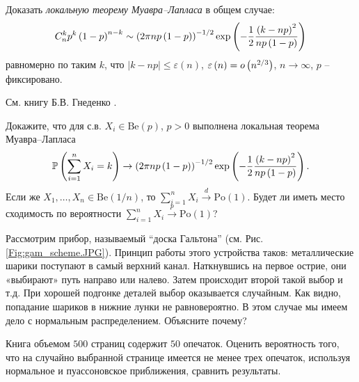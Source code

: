\begin{problem} Доказать \textit{локальную теорему Муавра--Лапласа} в общем случае:
\[
C_n^k p^k\left( {1-p} \right)^{n-k}\sim \left( {2\pi np\left( {1-p} \right)} 
\right)^{-1 \mathord{\left/ {\vphantom {1 2}} \right. 
\kern-\nulldelimiterspace} 2}\exp \left( {-\frac{1}{2}\frac{\left( {k-np} 
\right)^2}{np\left( {1-p} \right)}} \right)
\]
равномерно по таким $k$, что $\left| {k-np} \right|\le \varepsilon \left( n 
\right)$, $\varepsilon \left( n \right)=o\left( {n^{2 \mathord{\left/ 
{\vphantom {2 3}} \right. \kern-\nulldelimiterspace} 3}} \right)$, $n\to 
\infty $, $p$ -- фиксировано.
\end{problem}

\begin{ordre}
См. книгу Б.В. Гнеденко \cite{2}. 
\end{ordre}

\begin{problem}
Докажите, что для с.в. $X_i \in \text{Be}(p)$, $p > 0$ выполнена локальная теорема Муавра--Лапласа
\[
\PR\left(\sum_{i = 1}^n X_i = k \right) \to 
\left( {2\pi np\left( {1-p} \right)} 
\right)^{-1 \mathord{\left/ {\vphantom {1 2}} \right. 
\kern-\nulldelimiterspace} 2}\exp \left( {-\frac{1}{2}\frac{\left( {k-np} 
\right)^2}{np\left( {1-p} \right)}} \right).
\]
Если же $X_1,\ldots,X_n \in \text{Be}(1/n)$, то $\sum_{i = 1}^n X_i \mathop{\longrightarrow}\limits^{d} \text{Po}(1)$. Будет ли иметь место сходимость по вероятности  $\sum_{i = 1}^n X_i \mathop{\longrightarrow}\limits^{p} \text{Po}(1)$?

\end{problem}

\begin{problem}
Рассмотрим прибор, называемый ``доска Гальтона'' (см. Рис.\ref{Fig:gam_scheme.JPG}).
Принцип работы этого устройства таков: металлические шарики поступают в самый верхний канал. Наткнувшись на первое острие, они «выбирают» путь направо или налево. Затем происходит второй такой выбор и т.д. При хорошей подгонке деталей выбор оказывается случайным. Как видно, попадание шариков в нижние лунки не равновероятно. В этом случае мы имеем дело с нормальным распределением. Объясните почему?
\end{problem}

\begin{problem}
Книга объемом $500$ страниц содержит $50$ опечаток. Оценить вероятность того, что на случайно выбранной странице 
имеется не менее трех опечаток, используя нормальное и пуассоновское приближения, сравнить результаты. 
\end{problem}

